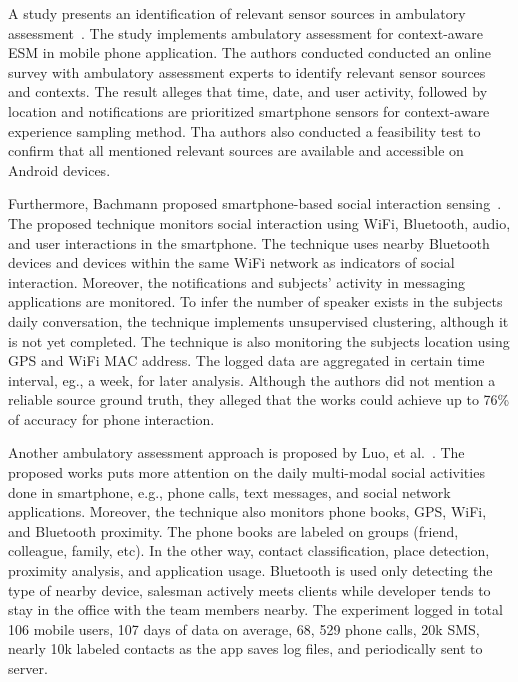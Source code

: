 A study presents an identification of relevant sensor sources in ambulatory assessment~\cite{thesis001}. The study implements ambulatory assessment for context-aware \ac{ESM} in mobile phone application. The authors conducted conducted an online survey with ambulatory assessment experts to identify relevant sensor sources and contexts. The result alleges that time, date, and user activity, followed by location and notifications are prioritized smartphone sensors for context-aware experience sampling method. Tha authors also conducted a feasibility test to confirm that all mentioned relevant sources are available and accessible on Android devices.

Furthermore, Bachmann proposed smartphone-based social interaction sensing~\cite{thesis031}. The proposed technique monitors social interaction using WiFi, Bluetooth, audio, and user interactions in the smartphone. The technique uses nearby Bluetooth devices and devices within the same WiFi network as indicators of social interaction. Moreover, the notifications and subjects' activity in messaging applications are monitored. To infer the number of speaker exists in the subjects daily conversation, the technique implements unsupervised clustering, although it is not yet completed. The technique is also monitoring the subjects location using GPS and WiFi \ac{MAC} address. The logged data are aggregated in certain time interval, eg., a week, for later analysis. Although the authors did not mention a reliable source ground truth, they alleged that the works could achieve up to 76\% of accuracy for phone interaction.

Another ambulatory assessment approach is proposed by Luo, et al.~\cite{thesis030}. The proposed works puts more attention on the daily multi-modal social activities done in smartphone, e.g., phone calls, text messages, and social network applications. Moreover, the technique also monitors phone books, GPS, WiFi, and Bluetooth proximity. The phone books are labeled on groups (friend, colleague, family, etc). In the other way, contact classification, place detection, proximity analysis, and application usage. Bluetooth is used only detecting the type of nearby device, salesman actively meets clients while developer tends to stay in the office with the team members nearby. The experiment logged in total 106 mobile users, 107 days of data on average, 68, 529 phone calls, 20k SMS, nearly 10k labeled contacts as the app saves log files, and periodically sent to server.














